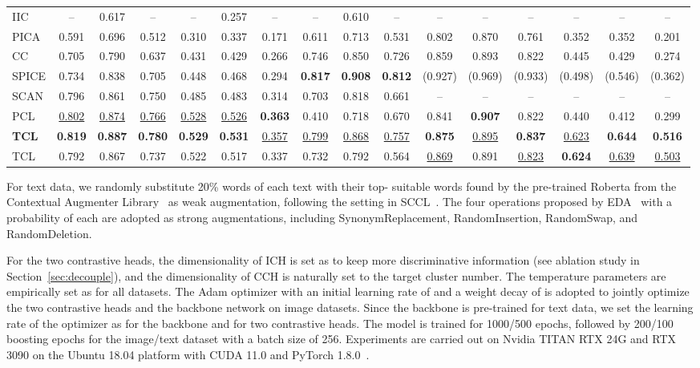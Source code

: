 \begin{table*}[t]
{\begin{tabular}{@{}lccccccccccccccc@{}}
IIC        & --     & 0.617 & --     & --     & 0.257 & --  & -- & 0.610 &  --      & --     & --     & --     & --     & --     & --         \\
PICA & 0.591 & 0.696 & 0.512 & 0.310 & 0.337 & 0.171 & 0.611 & 0.713 & 0.531 & 0.802 & 0.870 & 0.761 & 0.352 & 0.352 & 0.201  \\
CC & 0.705 & 0.790 & 0.637 & 0.431 & 0.429 & 0.266 & 0.746 & 0.850 & 0.726 & 0.859 & 0.893 & 0.822 & 0.445 & 0.429 & 0.274  \\
SPICE & 0.734 & 0.838 & 0.705 & 0.448 & 0.468 & 0.294 & \textbf{0.817} & \textbf{0.908} & \textbf{0.812} & (0.927) & (0.969) & (0.933) & (0.498) & (0.546) & (0.362)  \\
SCAN & 0.796 & 0.861 & 0.750 & 0.485 & 0.483 & 0.314 & 0.703 & 0.818 & 0.661 & -- & -- & -- & -- & -- & --  \\
PCL & \underline{0.802} & \underline{0.874} & \underline{0.766} & \underline{0.528} & \underline{0.526} & \textbf{0.363} & 0.410 & 0.718 & 0.670 & 0.841 & \textbf{0.907} & 0.822 & 0.440 & 0.412 & 0.299  \\ \hline
\textbf{TCL} & \textbf{0.819} & \textbf{0.887} & \textbf{0.780} & \textbf{0.529} &   \textbf{0.531} & \underline{0.357} & \underline{0.799} & \underline{0.868} & \underline{0.757} & \textbf{0.875} & \underline{0.895} & \textbf{0.837} &  \underline{0.623} & \textbf{0.644} & \textbf{0.516}  \\
TCL & 0.792 & 0.867 & 0.737 & 0.522 & 0.517 & 0.337 & 0.732 & 0.792 & 0.564 & \underline{0.869} & 0.891 & \underline{0.823} & \textbf{0.624} & \underline{0.639} & \underline{0.503}  \\ \bottomrule
\end{tabular}
}
\label{tab:result}
\end{table*}

For text data, we randomly substitute 20\% words of each text with their top- suitable words found by the pre-trained Roberta from the Contextual Augmenter Library~\citep{ma2019nlpaug} as weak augmentation, following the setting in SCCL~\citep{SCCL}. The four operations proposed by EDA~\citep{EDA} with a probability of  each are adopted as strong augmentations, including SynonymReplacement, RandomInsertion, RandomSwap, and RandomDeletion.

For the two contrastive heads, the dimensionality of ICH is set as  to keep more discriminative information (see ablation study in Section~\ref{sec:decouple}), and the dimensionality of CCH is naturally set to the target cluster number. The temperature parameters are empirically set as  for all datasets. The Adam optimizer with an initial learning rate of  and a weight decay of  is adopted to jointly optimize the two contrastive heads and the backbone network on image datasets. Since the backbone is pre-trained for text data, we set the learning rate of the optimizer as  for the backbone and  for two contrastive heads. The model is trained for 1000/500 epochs, followed by 200/100 boosting epochs for the image/text dataset with a batch size of 256. Experiments are carried out on Nvidia TITAN RTX 24G and RTX 3090 on the Ubuntu 18.04 platform with CUDA 11.0 and PyTorch 1.8.0~\citep{PyTorch}.

